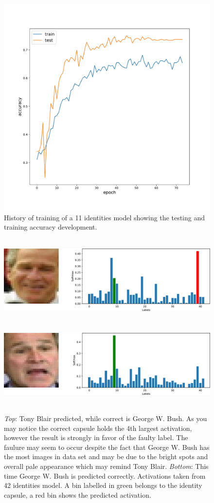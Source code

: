 \begin{figure}[ht]
    \centering
    \includegraphics[width=.7\textwidth]{obrazky-figures/training.pdf}
    \caption{History of training of a 11 identities model showing the testing and training accuracy development.}
    \label{fig:accuracy}
\end{figure}

\begin{figure}[ht]
    \centering
    \includegraphics[height=12em]{obrazky-figures/predicted_131_fail.pdf}
    \vspace{1em}
    \includegraphics[height=12em]{obrazky-figures/predicted_116_ok.pdf}
    \caption{\textit{Top}: Tony Blair predicted, while correct is George W. Bush. As you may notice the correct capsule holds the 4th largest activation, however the result is strongly in favor of the faulty label. The faulure may seem to occur despite the fact that George W. Bush has the most images in data set and may be due to the bright spots and overall pale appearance which may remind Tony Blair. \textit{Bottom}: This time George W. Bush is predicted correctly. Activations taken from 42 identities model. A bin labelled in green belongs to the identity capsule, a red bin shows the predicted activation.}
    \label{fig:bush}
\end{figure}

